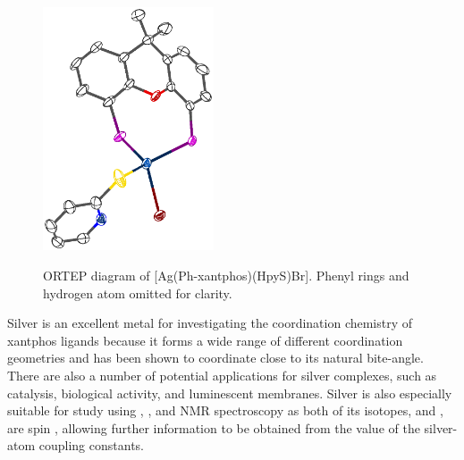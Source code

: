 \begin{figure}[htb] 
\begin{center}
\vspace{0.5cm}
\includegraphics[width=0.45\textwidth]{../Othercrystals/AgxantphosBrHpyS.eps}
\caption[ORTEP diagram of Ag(Ph-xantphos)(HpyS)Br]{ORTEP diagram of [Ag(Ph-xantphos)(HpyS)Br].\cite{Kaltzoglou2007} Phenyl rings and hydrogen atom omitted for clarity.}
\vspace{0.2cm}
\label{AgxantphosBrHpyS}
\end{center}
\end{figure}
\vspace{0.2cm}



Silver is an excellent metal for investigating the coordination chemistry of xantphos ligands because 
it forms a wide range of different coordination geometries and has been shown to coordinate \Phxantphos{} close to its natural bite-angle.\cite{Kaltzoglou2007}  There are also a number of potential applications for silver complexes, such as catalysis, biological activity, and luminescent membranes.  Silver is also especially suitable for study using \proton{}, \carbon{}, and \phosphorus{} NMR spectroscopy as both of its isotopes, \Agseven{} and \Agnine{}, are spin , allowing further information to be obtained from the value of the silver-atom coupling constants.  

